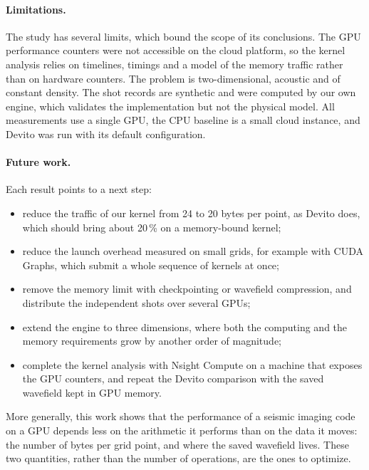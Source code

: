 \documentclass[letterpaper,11pt,leqno]{article}
\newcommand{\bib}{paper.bib}
\begin{document}
\paragraph{Limitations.}
The study has several limits, which bound the scope of its conclusions. The
GPU performance counters were not accessible on the cloud platform, so the
kernel analysis relies on timelines, timings and a model of the memory traffic
rather than on hardware counters. The problem is two-dimensional, acoustic and
of constant density. The shot records are synthetic and were computed by our
own engine, which validates the implementation but not the physical model. All
measurements use a single GPU, the CPU baseline is a small cloud instance, and
Devito was run with its default configuration.

\paragraph{Future work.}
Each result points to a next step:
\begin{itemize}
\item reduce the traffic of our kernel from 24 to 20 bytes per point, as Devito
  does, which should bring about 20\,\% on a memory-bound kernel;
\item reduce the launch overhead measured on small grids, for example with
  CUDA Graphs, which submit a whole sequence of kernels at once;
\item remove the memory limit with checkpointing or wavefield compression, and
  distribute the independent shots over several GPUs;
\item extend the engine to three dimensions, where both the computing and the
  memory requirements grow by another order of magnitude;
\item complete the kernel analysis with Nsight Compute on a machine that
  exposes the GPU counters, and repeat the Devito comparison with the saved
  wavefield kept in GPU memory.
\end{itemize}

More generally, this work shows that the performance of a seismic imaging code
on a GPU depends less on the arithmetic it performs than on the data it moves:
the number of bytes per grid point, and where the saved wavefield lives. These
two quantities, rather than the number of operations, are the ones to optimize.


\end{document}
